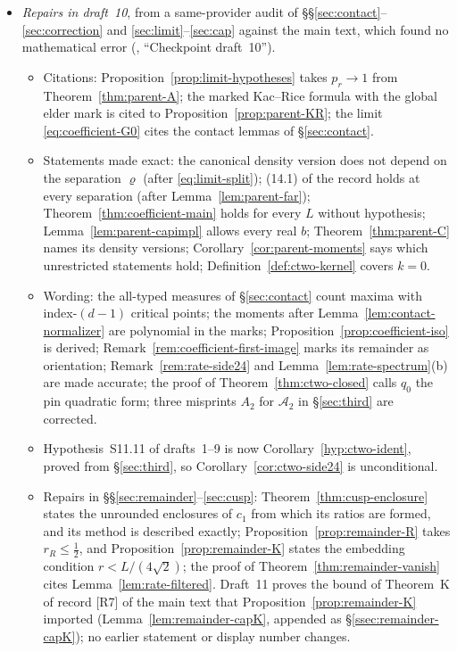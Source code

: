 \begin{itemize}[leftmargin=1.5em,itemsep=2pt]
\begin{itemize}[leftmargin=1.2em,itemsep=1pt]
  \item No statement or display number of draft~8 changes; the new statements are Lemmas~\ref{lem:selection-gauss}--\ref{lem:selection-fincol}, with displays \eqref{eq:selection-gaussjoint}--\eqref{eq:selection-Nlim}, at the end of \S\ref{sec:selection}.
  \end{itemize}
\item \emph{Repairs in draft~10}, from a same-provider audit of \S\S\ref{sec:contact}--\ref{sec:correction} and \ref{sec:limit}--\ref{sec:cap} against the main text, which found no mathematical error (, ``Checkpoint draft~10'').
  \begin{itemize}[leftmargin=1.2em,itemsep=1pt]
  \item Citations: Proposition~\ref{prop:limit-hypotheses} takes $p_r\to1$ from Theorem~\ref{thm:parent-A}; the marked Kac--Rice formula with the global elder mark is cited to Proposition~\ref{prop:parent-KR}; the limit \eqref{eq:coefficient-G0} cites the contact lemmas of \S\ref{sec:contact}.
  \item Statements made exact: the canonical density version does not depend on the separation $\varrho$ (after \eqref{eq:limit-split}); (14.1) of the record holds at every separation (after Lemma~\ref{lem:parent-far}); Theorem~\ref{thm:coefficient-main} holds for every $L$ without hypothesis; Lemma~\ref{lem:parent-capimpl} allows every real $b$; Theorem~\ref{thm:parent-C} names its density versions; Corollary~\ref{cor:parent-moments} says which unrestricted statements hold; Definition~\ref{def:ctwo-kernel} covers $k=0$.
  \item Wording: the all-typed measures of \S\ref{sec:contact} count maxima with index-$(d-1)$ critical points; the moments after Lemma~\ref{lem:contact-normalizer} are polynomial in the marks; Proposition~\ref{prop:coefficient-iso} is derived; Remark~\ref{rem:coefficient-first-image} marks its remainder as orientation; Remark~\ref{rem:rate-side24} and Lemma~\ref{lem:rate-spectrum}(b) are made accurate; the proof of Theorem~\ref{thm:ctwo-closed} calls $q_0$ the pin quadratic form; three misprints $A_2$ for $\mathcal A_2$ in \S\ref{sec:third} are corrected.
  \item Hypothesis~S11.11 of drafts~1--9 is now Corollary~\ref{hyp:ctwo-ident}, proved from \S\ref{sec:third}, so Corollary~\ref{cor:ctwo-side24} is unconditional.
  \item Repairs in \S\S\ref{sec:remainder}--\ref{sec:cusp}: Theorem~\ref{thm:cusp-enclosure} states the unrounded enclosures of $c_1$ from which its ratios are formed, and its method is described exactly; Proposition~\ref{prop:remainder-R} takes $r_R\le\frac12$, and Proposition~\ref{prop:remainder-K} states the embedding condition $r<L/(4\sqrt2)$; the proof of Theorem~\ref{thm:remainder-vanish} cites Lemma~\ref{lem:rate-filtered}. Draft~11 proves the bound of Theorem~K of record [R7] of the main text that Proposition~\ref{prop:remainder-K} imported (Lemma~\ref{lem:remainder-capK}, appended as \S\ref{ssec:remainder-capK}); no earlier statement or display number changes.

\end{itemize}
\end{itemize}
